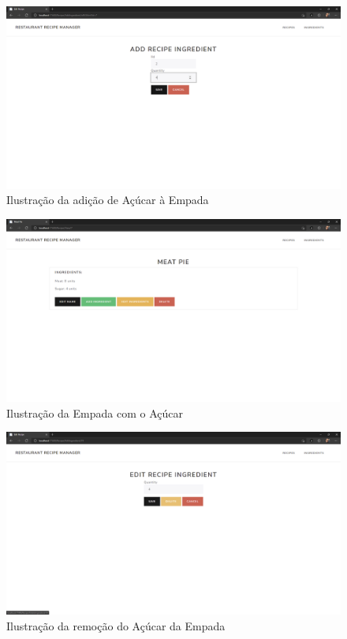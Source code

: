 \FloatBarrier
\begin{figure}[!hbt]
    \centering
    \includegraphics[width=14cm]{Resources/WebApp/Recipes/recipe (16).png}
    \caption{Ilustração da adição de Açúcar à Empada}
    
\end{figure}
\FloatBarrier
\begin{figure}[!hbt]
    \centering
    \includegraphics[width=14cm]{Resources/WebApp/Recipes/recipe (17).png}
    \caption{Ilustração da Empada com o Açúcar}
    
\end{figure}
\FloatBarrier
\begin{figure}[!hbt]
    \centering
    \includegraphics[width=14cm]{Resources/WebApp/Recipes/recipe (18).png}
    \caption{Ilustração da remoção do Açúcar da Empada}
    
\end{figure}
